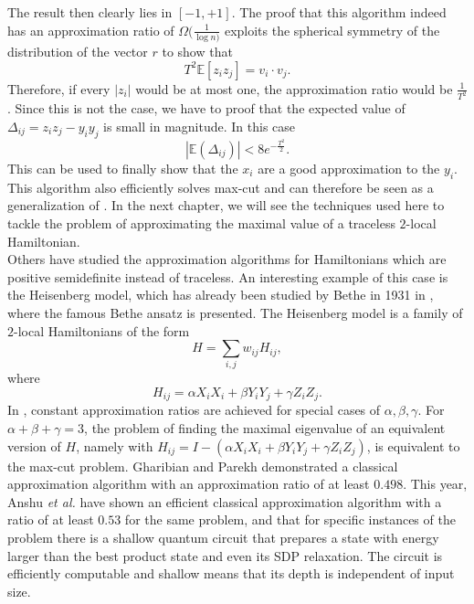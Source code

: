 The result then clearly lies in $\left[ -1,+1\right]$.
The proof that this algorithm indeed has an approximation ratio of $\Omega(\frac{1}{\log{}n)}$ exploits the spherical symmetry of the distribution of the vector $r$ to show that \[
T^2\mathbb{E}\left[ z_iz_j \right] = v_i\cdot v_j
.\]
Therefore, if every $\left| z_i \right| $ would be at most one, the approximation ratio would be $\frac{1}{T^2}$.
Since this is not the case, we have to proof that the expected value of $\Delta_{ij}=z_iz_j - y_iy_j$ is small in magnitude.
In this case \[
	\left|\mathbb{E}(\Delta_{ij})\right|<8e^{-\frac{T^2}{2}}
.\]
This can be used to finally show that the $x_i$ are a good approximation to the $y_i$.
This algorithm also efficiently solves max-cut and can therefore be seen as a generalization of \cite{goemans95}.
In the next chapter, we will see the techniques used here to tackle the problem of approximating the maximal value of a traceless $2$-local Hamiltonian.\\
Others have studied the approximation algorithms for Hamiltonians which are positive semidefinite instead of traceless. \cite{gharibian19,anshu20,brandao14}
An interesting example of this case is the Heisenberg model, which has already been studied by Bethe in 1931 in \cite{bethe31}, where the famous Bethe ansatz is presented.
The Heisenberg model is a family of $2$-local Hamiltonians of the form \[
H=\sum_{i,j} w_{ij}H_{ij}
,\] where \[
H_{ij}=\alpha X_iX_i + \beta Y_iY_j + \gamma Z_iZ_j
.\]
In \cite{gharibian19}, constant approximation ratios are achieved for special cases of $\alpha, \beta, \gamma$.
For $\alpha+\beta+\gamma=3$, the problem of finding the maximal eigenvalue of an equivalent version of $H$, namely with  $H_{ij}=I-(\alpha X_iX_i + \beta Y_iY_j + \gamma Z_iZ_j)$, is equivalent to the max-cut problem.
Gharibian and Parekh demonstrated a classical approximation algorithm with an approximation ratio of at least $0.498$.
This year, Anshu \emph{et al.} \cite{anshu20} have shown an efficient classical approximation algorithm with a ratio of at least $0.53$ for the same problem, and that for specific instances of the problem there is a shallow quantum circuit that prepares a state with energy larger than the best product state and even its SDP relaxation.
The circuit is efficiently computable and shallow means that its depth is independent of input size.
